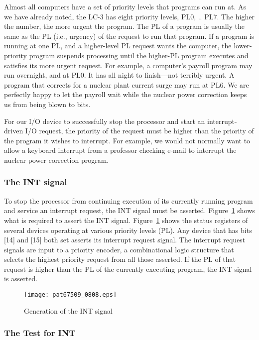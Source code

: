 \documentclass{patt}
\begin{document}
Almost all computers have a set of priority levels that programs can
run at.  As we have already noted, the LC-3 has eight priority levels, 
PL0, .. PL7.  The higher
the number, the more urgent the program.  The PL of a program is
usually the same as the PL (i.e., urgency) of the request to run that
program. If a program is running at one PL, and a higher-level PL
request wants the computer, the lower-priority program
suspends processing until the higher-PL program executes and satisfies
its more urgent request.  For example, a computer's payroll program
may run overnight, and at PL0.  It has all night to finish---not
terribly urgent.  A program that corrects for a nuclear plant current
surge may run at PL6.  We are perfectly happy to let the payroll wait
while the nuclear power correction keeps us from being blown to bits.

For our I/O device to successfully stop the processor and start an
interrupt-driven I/O request, the priority of the request must be
higher than the priority of the program it wishes to interrupt.  For
example, we would not normally want to allow a keyboard interrupt from
a professor checking e-mail to interrupt the nuclear power correction
program.

\subsubsection{The INT signal}

To stop the processor from continuing execution of its currently running
program and service an interrupt request, the INT signal must be 
asserted.  Figure~\ref{fig:generation.interrupt.signal} shows what is
required to assert the INT signal.
Figure~\ref{fig:generation.interrupt.signal}
shows the status registers of several devices operating at various
priority levels (PL).  Any device that has bits [14] and [15] both set
asserts its interrupt request signal.  The interrupt request signals
are input to a priority encoder, a combinational logic structure that
selects the highest priority request from all those asserted.  If the
PL of that request is higher than the PL of the currently executing
program, the INT signal is asserted.

\begin{figure}[h!]
\centerline{\texttt{[image: pat67509\_0808.eps]}}
\caption{Generation of the INT signal}
\label{fig:generation.interrupt.signal}
\end{figure}

\FloatBarrier
\subsubsection{The Test for INT} 
\end{document}
